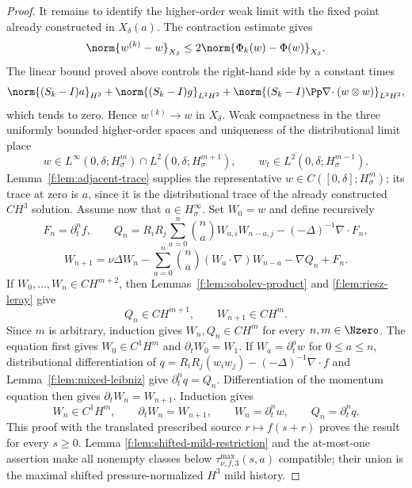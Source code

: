 \begin{proof}
It remains to identify the higher-order weak limit with the fixed point already
constructed in \(X_\delta(a)\).  The contraction estimate gives
\[
 \norm{w^{(k)}-w}_{X_\delta}
 \le2\norm{\Phi_k(w)-\Phi(w)}_{X_\delta}.
\]
The linear bound proved above controls the right-hand side by a constant times
\[
 \norm{(S_k-I)a}_{H^3}
 +\norm{(S_k-I)g}_{L^2H^2}
 +\norm{(S_k-I)\Pp\nabla\!\cdot(w\otimes w)}_{L^2H^2},
\]
which tends to zero.  Hence \(w^{(k)}\to w\) in \(X_\delta\).  Weak
compactness in the three uniformly bounded higher-order spaces and uniqueness
of the distributional limit place
\[
 w\in L^\infty(0,\delta;H^m_\sigma)\cap L^2(0,\delta;H^{m+1}_\sigma),
 \qquad w_t\in L^2(0,\delta;H^{m-1}_\sigma).
\]
Lemma~\ref{f:lem:adjacent-trace} supplies the representative
\(w\in C([0,\delta];H^m_\sigma)\); its trace at zero is \(a\), since it is
the distributional trace of the already constructed \(C H^3\) solution.
Assume now that \(a\in H^\infty_\sigma\).  Set \(W_0=w\) and define
recursively
\[
 F_n=\partial_t^nf,\qquad
 Q_n=R_iR_j\sum_{a=0}^n\binom naW_{a,i}W_{n-a,j}
 -(-\Delta)^{-1}\nabla\cdot F_n,
\]
\[
 W_{n+1}=\nu\Delta W_n
 -\sum_{a=0}^n\binom na(W_a\cdot\nabla)W_{n-a}-\nabla Q_n+F_n.
\]
If \(W_0,\ldots,W_n\in C H^{m+2}\), then
Lemmas~\ref{f:lem:sobolev-product} and \ref{f:lem:riesz-leray} give
\[
 Q_n\in C H^{m+1},
 \qquad
 W_{n+1}\in C H^m.
\]
Since \(m\) is arbitrary, induction gives \(W_n,Q_n\in C H^m\) for every
\(n,m\in\Nzero\).  The equation first gives
\(W_0\in C^1H^m\) and \(\partial_tW_0=W_1\).  If
\(W_a=\partial_t^aw\) for \(0\le a\le n\), distributional differentiation
of
\(
 q=R_iR_j(w_iw_j)-(-\Delta)^{-1}\nabla\cdot f
\)
and Lemma~\ref{f:lem:mixed-leibniz} give
\(\partial_t^nq=Q_n\).  Differentiation of the momentum equation then gives
\(\partial_tW_n=W_{n+1}\).  Induction gives
\[
 W_n\in C^1H^m,
 \qquad
 \partial_tW_n=W_{n+1},
 \qquad
 W_n=\partial_t^nw,
 \qquad
 Q_n=\partial_t^nq.
\]
This proof with the translated prescribed source
\(r\mapsto f(s+r)\) proves the result for every \(s\ge0\).  Lemma
\ref{f:lem:shifted-mild-restriction} and the at-most-one assertion make all
nonempty classes below \(\tau_{\nu,f,3}^{\max}(s,a)\) compatible; their union
is the maximal shifted pressure-normalized \(H^3\) mild history.
\end{proof}
